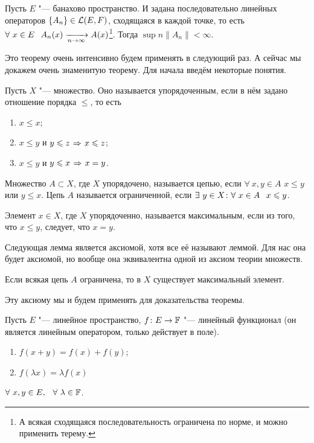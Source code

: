 \begin{Sl}
  Пусть $E$ "--- банахово пространство. И задана последовательно линейных операторов $\{A_n\}\in\mathcal L(E,F)$, сходящаяся в каждой точке, то есть $\forall\ x\in E\pau A_n(x)\te A(x)$\footnote{А всякая сходящаяся последовательность ограничена по норме, и можно применить терему.}. Тогда $\sup\limits{n}\|A_n\|<\infty$.
\end{Sl}

Это теорему очень интенсивно будем применять в следующий раз. А сейчас мы докажем очень знаменитую теорему. Для начала введём некоторые понятия.
\begin{Def}
  Пусть $X$ "--- множество. Оно называется упорядоченным, если в нём задано отношение порядка $\le$, то есть
\begin{enumerate}
  \item $x\le x$; \item $x\le y$ и  $y\le z\imp x\le z$; \item $x\le y$ и $y\le x\imp x=y$.
\end{enumerate}  
\end{Def}
\begin{Def}
  Множество $A\subset X$, где $X$ упорядочено, называется цепью, если $\forall\ x,y\in A$ $x\le y$  или $y\le x$. Цепь $A$ называется ограниченной, если $\exists\ y\in X\colon\forall\ x\in A\pau x\le y$.
\end{Def}
\begin{Def}
  Элемент $x\in X$, где $X$ упорядоченно, называется максимальным, если из того, что $x\le y$, следует, что $x=y$.
\end{Def}

Следующая лемма является аксиомой, хотя все её называют леммой. Для нас она будет аксиомой, но вообще она эквивалентна одной из аксиом теории множеств.
\begin{Lem}
  Если всякая цепь $A$ ограничена, то в $X$ существует максимальный элемент.
\end{Lem}

Эту аксиому мы и будем применять для доказательства теоремы.

Пусть $E$ "--- линейное пространство, $f\colon E\rightarrow\mathbb F$ "--- линейный функционал (он является линейным оператором, только действует в поле).
\begin{enumerate}
  \item $f(x+y) = f(x)+f(y)$; \item $f(\lambda x) = \lambda f(x)$
\end{enumerate}
$\forall\ x,y\in E,\pau \forall\ \lambda\in \F$.

